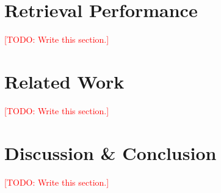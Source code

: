 \documentclass{article}
\newcommand{\todo}[1]{\textcolor{red}{[TODO: #1]}}
\begin{document}
\section{Retrieval Performance}
\label{sec:retrieval}
\todo{Write this section.}

\section{Related Work}
\label{sec:related}
\todo{Write this section.}

\section{Discussion \& Conclusion}
\label{sec:conclusion}
\todo{Write this section.}



\end{document}
